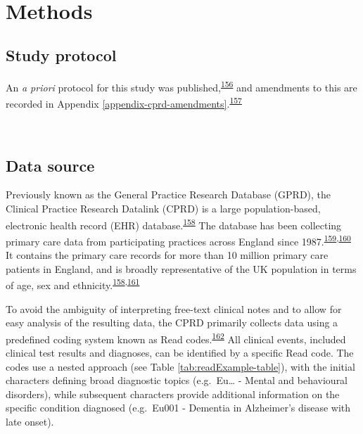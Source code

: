 \documentclass[a4paper, twoside]{templates/ociamthesis}
\begin{document}
~

\hypertarget{methods-1}{%
\section{Methods}\label{methods-1}}

\hypertarget{study-protocol}{%
\subsection{Study protocol}\label{study-protocol}}

An \emph{a priori} protocol for this study was published,\textsuperscript{\protect\hyperlink{ref-walker2016}{156}} and amendments to this are recorded in Appendix \ref{appendix-cprd-amendments}.\textsuperscript{\protect\hyperlink{ref-vonelm2008}{157}}

~

\hypertarget{cprd-data-source}{%
\subsection{Data source}\label{cprd-data-source}}

Previously known as the General Practice Research Database (GPRD), the Clinical Practice Research Datalink (CPRD) is a large population-based, electronic health record (EHR) database.\textsuperscript{\protect\hyperlink{ref-herrett2015}{158}} The database has been collecting primary care data from participating practices across England since 1987.\textsuperscript{\protect\hyperlink{ref-williams2012}{159},\protect\hyperlink{ref-wood2001revitalizing}{160}} It contains the primary care records for more than 10 million primary care patients in England, and is broadly representative of the UK population in terms of age, sex and ethnicity.\textsuperscript{\protect\hyperlink{ref-herrett2015}{158},\protect\hyperlink{ref-mathur2014}{161}}

To avoid the ambiguity of interpreting free-text clinical notes and to allow for easy analysis of the resulting data, the CPRD primarily collects data using a predefined coding system known as Read codes.\textsuperscript{\protect\hyperlink{ref-booth1994}{162}} All clinical events, included clinical test results and diagnoses, can be identified by a specific Read code. The codes use a nested approach (see Table \ref{tab:readExample-table}), with the initial characters defining broad diagnostic topics (e.g.~Eu\ldots{} - Mental and behavioural disorders), while subsequent characters provide additional information on the specific condition diagnosed (e.g.~Eu001 - Dementia in Alzheimer's disease with late onset).
\end{document}
